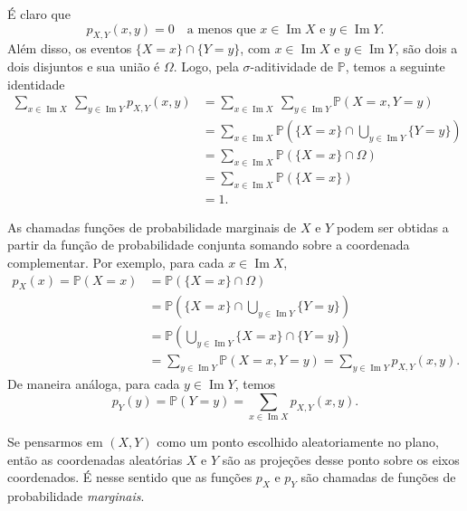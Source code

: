 \documentclass[12pt,portuguese]{article}
\theoremstyle{definition}
\begin{document}
É claro que
\begin{equation}\label{eq:conjunta-suporte}
  p_{X,Y}(x, y) = 0 \quad \text{a menos que } x \in \operatorname{Im} X \text{ e } y \in \operatorname{Im} Y.
\end{equation}
Além disso, os eventos $\{X=x\}\cap\{Y=y\}$, com
$x\in\operatorname{Im}X$ e $y\in\operatorname{Im}Y$, são dois a dois disjuntos
e sua união é $\Omega$. Logo, pela $\sigma$-aditividade de $\mathbb{P}$, temos
a seguinte identidade 
\begin{align}\label{eq:conjunta-soma-um}
\sum_{x \in \operatorname{Im} X}\ \sum_{y \in \operatorname{Im} Y} p_{X,Y}(x, y) 
&=
\sum_{x \in \operatorname{Im} X}\ \sum_{y \in \operatorname{Im} Y} \mathbb{P}(X=x,Y=y)
\nonumber\\[0.3cm]
&=
\sum_{x \in \operatorname{Im} X} \mathbb{P}\left( \{X=x\} \cap \bigcup_{y \in \operatorname{Im} Y} \{Y=y\}\right)
\nonumber\\[0.3cm]
&=
\sum_{x \in \operatorname{Im} X} \mathbb{P}\left( \{X=x\} \cap \Omega \right)
\nonumber\\[0.3cm]
&=
\sum_{x \in \operatorname{Im} X} \mathbb{P}\left( \{X=x\} \right)
\nonumber\\[0.3cm]
&= 1.
\end{align}

As chamadas funções de probabilidade marginais de $X$ e $Y$ podem ser obtidas a partir
da função de probabilidade conjunta somando sobre a coordenada complementar.
Por exemplo, para cada $x\in\operatorname{Im}X$,
\begin{align}\label{eq:marginal-X}
p_X(x) = \mathbb{P}(X = x) 
&=
\mathbb{P}(\{X = x\}\cap \Omega) 
\nonumber\\[0.3cm]
&=
\mathbb{P}\left( \{X = x\} \cap \bigcup_{y \in \operatorname{Im} Y} \{Y=y\} \right) 
\nonumber\\[0.3cm]
&=
\mathbb{P}\left(\bigcup_{y \in \operatorname{Im} Y} \{X = x\} \cap  \{Y=y\} \right) 
\nonumber\\[0.3cm]
&=
\sum_{y \in \operatorname{Im} Y} \mathbb{P}(X = x, Y = y)
= \sum_{y \in \operatorname{Im} Y} p_{X,Y}(x, y).
\end{align}
De maneira análoga, para cada $y\in\operatorname{Im}Y$, temos 
\begin{equation}\label{eq:marginal-Y}
  p_Y(y) = \mathbb{P}(Y = y) = \sum_{x \in \operatorname{Im} X} p_{X,Y}(x, y).
\end{equation}

\bigskip 
Se pensarmos em $(X,Y)$ como um ponto escolhido aleatoriamente no plano,
então as coordenadas aleatórias $X$ e $Y$ são as projeções desse ponto sobre os eixos coordenados. É
nesse sentido que as funções $p_X$ e $p_Y$ são chamadas de funções de
probabilidade \emph{marginais}.
\end{document}
